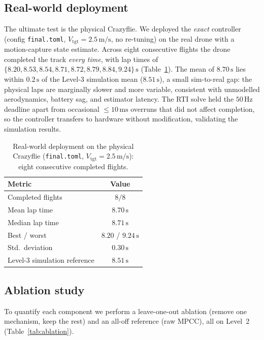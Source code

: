 \documentclass[conference]{IEEEtran}
\begin{document}
\subsection{Real-world deployment}
The ultimate test is the physical Crazyflie. We deployed the \emph{exact} controller
(config \texttt{final.toml}, $V_{\mathrm{tgt}}=2.5\,\mathrm{m/s}$, no re-tuning) on
the real drone with a motion-capture state estimate. Across eight consecutive
flights the drone completed the track \emph{every time}, with lap times of
$\{8.20, 8.53, 8.54, 8.71, 8.72, 8.79, 8.84, 9.24\}\,\mathrm{s}$
(Table~\ref{tab:real}). The mean of $8.70\,\mathrm{s}$ lies within
$0.2\,\mathrm{s}$ of the Level-3 simulation mean ($8.51\,\mathrm{s}$), a small
sim-to-real gap: the physical laps are marginally slower and more variable,
consistent with unmodelled aerodynamics, battery sag, and estimator latency. The
RTI solve held the $50\,\mathrm{Hz}$ deadline apart from occasional
$\le 10\,\mathrm{ms}$ overruns that did not affect completion, so the controller
transfers to hardware without modification, validating the simulation results.

\begin{table}[t]
\centering
\caption{Real-world deployment on the physical Crazyflie
(\texttt{final.toml}, $V_{\mathrm{tgt}}=2.5\,\mathrm{m/s}$): eight consecutive
completed flights.}
\label{tab:real}
\begin{tabular}{lc}
\toprule
Metric & Value\\
\midrule
Completed flights & $8/8$\\
Mean lap time & $8.70\,\mathrm{s}$\\
Median lap time & $8.71\,\mathrm{s}$\\
Best / worst & $8.20$ / $9.24\,\mathrm{s}$\\
Std.\ deviation & $0.30\,\mathrm{s}$\\
Level-3 simulation reference & $8.51\,\mathrm{s}$\\
\bottomrule
\end{tabular}
\end{table}

\subsection{Ablation study}
To quantify each component we perform a leave-one-out ablation (remove one
mechanism, keep the rest) and an all-off reference (raw MPCC), all on Level~2
(Table~\ref{tab:ablation}).
\end{document}
